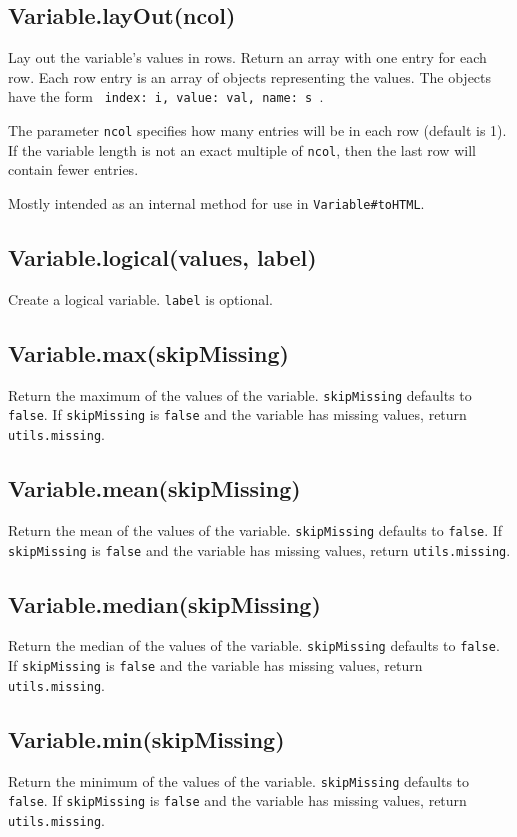 \documentclass{article}
\begin{document}
    \subsection{Variable.layOut(ncol)}
    Lay out the variable's values in rows. Return an array with one entry for
each row. Each row entry is an array of objects representing the values.
The objects have the form \texttt{{ index: i, value: val, name: s }}.


The parameter \texttt{ncol} specifies how many entries will be in each row (default
is 1). If the variable length is not an exact multiple of \texttt{ncol}, then the
last row will contain fewer entries.


Mostly intended as an internal method for use in \texttt{Variable\#toHTML}.


    \subsection{Variable.logical(values, label)}
    Create a logical variable. \texttt{label} is optional.


    \subsection{Variable.max(skipMissing)}
    Return the maximum of the values of the variable.
\texttt{skipMissing} defaults to \texttt{false}.  If \texttt{skipMissing} is \texttt{false} and
the variable has missing values, return \texttt{utils.missing}.


    \subsection{Variable.mean(skipMissing)}
    Return the mean of the values of the variable.
\texttt{skipMissing} defaults to \texttt{false}.  If \texttt{skipMissing} is \texttt{false} and
the variable has missing values, return \texttt{utils.missing}.


    \subsection{Variable.median(skipMissing)}
    Return the median of the values of the variable.
\texttt{skipMissing} defaults to \texttt{false}.  If \texttt{skipMissing} is \texttt{false} and
the variable has missing values, return \texttt{utils.missing}.


    \subsection{Variable.min(skipMissing)}
    Return the minimum of the values of the variable.
\texttt{skipMissing} defaults to \texttt{false}.  If \texttt{skipMissing} is \texttt{false} and
the variable has missing values, return \texttt{utils.missing}.
\end{document}
